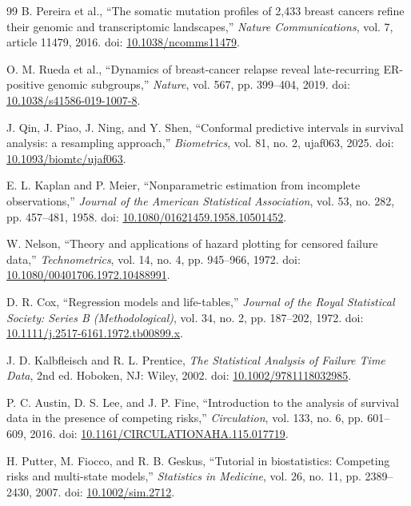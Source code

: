 \documentclass[12pt]{article}
\begin{document}
\begin{thebibliography}{99}
B. Pereira et al., ``The somatic mutation profiles of 2,433 breast cancers refine
their genomic and transcriptomic landscapes,'' \textit{Nature Communications},
vol. 7, article 11479, 2016.
doi: \href{https://doi.org/10.1038/ncomms11479}{10.1038/ncomms11479}.

O. M. Rueda et al., ``Dynamics of breast-cancer relapse reveal late-recurring
ER-positive genomic subgroups,'' \textit{Nature}, vol. 567, pp. 399--404, 2019.
doi: \href{https://doi.org/10.1038/s41586-019-1007-8}{10.1038/s41586-019-1007-8}.

J. Qin, J. Piao, J. Ning, and Y. Shen, ``Conformal predictive intervals in
survival analysis: a resampling approach,'' \textit{Biometrics}, vol. 81,
no. 2, ujaf063, 2025.
doi: \href{https://doi.org/10.1093/biomtc/ujaf063}{10.1093/biomtc/ujaf063}.

E. L. Kaplan and P. Meier, ``Nonparametric estimation from incomplete
observations,'' \textit{Journal of the American Statistical Association},
vol. 53, no. 282, pp. 457--481, 1958.
doi: \href{https://doi.org/10.1080/01621459.1958.10501452}{10.1080/01621459.1958.10501452}.

W. Nelson, ``Theory and applications of hazard plotting for censored failure
data,'' \textit{Technometrics}, vol. 14, no. 4, pp. 945--966, 1972.
doi: \href{https://doi.org/10.1080/00401706.1972.10488991}{10.1080/00401706.1972.10488991}.

D. R. Cox, ``Regression models and life-tables,''
\textit{Journal of the Royal Statistical Society: Series B (Methodological)},
vol. 34, no. 2, pp. 187--202, 1972.
doi: \href{https://doi.org/10.1111/j.2517-6161.1972.tb00899.x}{10.1111/j.2517-6161.1972.tb00899.x}.

J. D. Kalbfleisch and R. L. Prentice, \textit{The Statistical Analysis of
Failure Time Data}, 2nd ed. Hoboken, NJ: Wiley, 2002.
doi: \href{https://doi.org/10.1002/9781118032985}{10.1002/9781118032985}.

P. C. Austin, D. S. Lee, and J. P. Fine, ``Introduction to the analysis of
survival data in the presence of competing risks,'' \textit{Circulation},
vol. 133, no. 6, pp. 601--609, 2016.
doi: \href{https://doi.org/10.1161/CIRCULATIONAHA.115.017719}{10.1161/CIRCULATIONAHA.115.017719}.

H. Putter, M. Fiocco, and R. B. Geskus, ``Tutorial in biostatistics: Competing
risks and multi-state models,'' \textit{Statistics in Medicine}, vol. 26,
no. 11, pp. 2389--2430, 2007.
doi: \href{https://doi.org/10.1002/sim.2712}{10.1002/sim.2712}.


\end{thebibliography}
\end{document}

